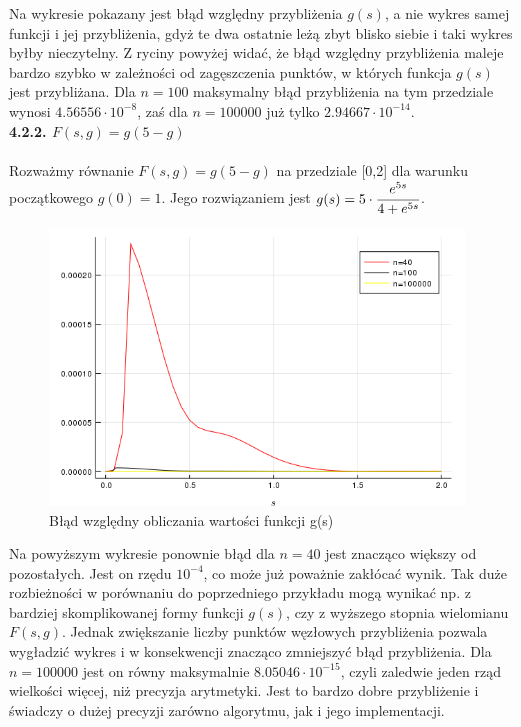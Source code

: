 \documentclass[a4paper]{article}
\begin{document}
Na wykresie pokazany jest błąd względny przybliżenia $g(s)$, a nie wykres samej funkcji i jej przybliżenia, gdyż te dwa ostatnie leżą zbyt blisko siebie i taki wykres byłby nieczytelny. Z ryciny powyżej widać, że błąd względny przybliżenia maleje  bardzo szybko w zależności od zagęszczenia punktów, w których funkcja $g(s)$ jest przybliżana. Dla $n=100$ maksymalny błąd przybliżenia na tym przedziale wynosi  $4.56556 \cdot 10^{-8}$, zaś dla $n=100000$ już tylko $2.94667 \cdot 10^{-14}$.\\

\large
\textbf{4.2.2. $F(s,g) = g(5-g)$}\\\\
\normalsize
Rozważmy równanie $F(s,g) = g(5-g)$ na przedziale [0,2] dla warunku początkowego $g(0) = 1$. Jego rozwiązaniem jest $g(s) = 5 \cdot \cfrac{e^{5s}}{4 + e^{5s}}$.

\begin{figure}[h!]
  \includegraphics[width=11cm]{F2_error.png}
  \caption{Błąd względny obliczania wartości funkcji g(s)}
\end{figure}

Na powyższym wykresie ponownie błąd dla $n=40$ jest znacząco większy od pozostałych. Jest on rzędu $10^{-4}$, co może już poważnie zakłócać wynik. Tak duże rozbieżności w porównaniu do poprzedniego przykładu mogą wynikać np. z bardziej skomplikowanej formy funkcji $g(s)$, czy z wyższego stopnia wielomianu $F(s,g)$. Jednak zwiększanie liczby punktów węzłowych przybliżenia pozwala wygładzić wykres i w konsekwencji znacząco zmniejszyć błąd przybliżenia. Dla $n=100000$ jest on równy maksymalnie $8.05046 \cdot 10^{-15}$, czyli zaledwie jeden rząd wielkości więcej, niż precyzja arytmetyki. Jest to bardzo dobre przybliżenie i świadczy o dużej precyzji zarówno algorytmu, jak i jego implementacji.\\
\end{document}
